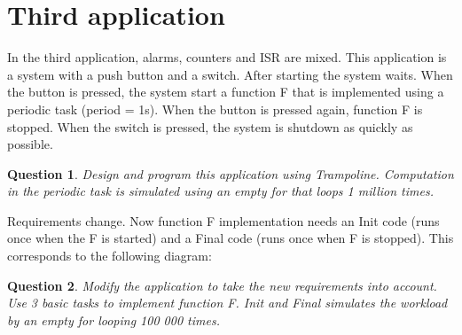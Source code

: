 \documentclass[11pt]{article}
\newtheorem{ex}{Question}
\begin{document}
\section{Third application}

In the third application, alarms, counters and ISR are mixed. This application is a system with a push button and a switch. After starting the system waits. When the button is pressed, the system start a function F that is implemented using a periodic task (period = 1s). When the button is pressed again, function F is stopped. When the switch is pressed, the system is shutdown as quickly as possible.

\begin{ex}
Design and program this application using Trampoline. Computation in the periodic task is simulated using an empty for that loops 1 million times.
\end{ex}

Requirements change. Now function F implementation needs an Init code
(runs once when the F is started) and a Final code (runs once when F is stopped).
This corresponds to the following diagram:

\begin{center}
\begin{adjustbox}{width=14cm,keepaspectratio}
\end{adjustbox}
\end{center}


\begin{ex}
Modify the application to take the new requirements into account. Use 3 basic tasks to implement function F. Init and Final simulates the workload by an empty for looping 100 000 times.
\end{ex}
\end{document}
